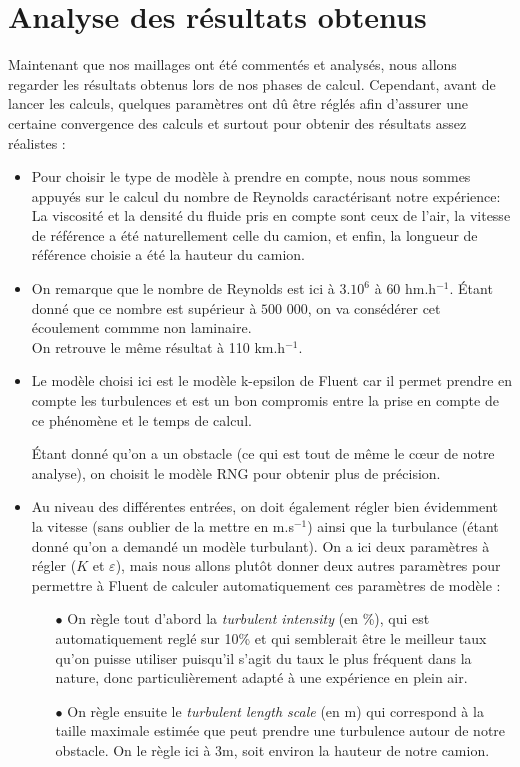 \section{Analyse des résultats obtenus}
Maintenant que nos maillages ont été commentés et analysés, nous allons regarder les résultats obtenus lors de nos phases de calcul. Cependant, avant de lancer les calculs, quelques paramètres ont dû être réglés afin d'assurer une certaine convergence des calculs et surtout pour obtenir des résultats assez réalistes :
\begin{itemize}
	\item Pour choisir le type de modèle à prendre en compte, nous nous sommes appuyés sur le calcul du nombre de Reynolds caractérisant notre expérience: La viscosité et la densité du fluide pris en compte sont ceux de l'air, la vitesse de référence a été naturellement celle du camion, et enfin, la longueur de référence choisie a été la hauteur du camion.
	\item On remarque que le nombre de Reynolds est ici à $3.10^6$ à $60$ hm.h$^{-1}$. Étant donné que ce nombre est supérieur à $500$ $000$, on va consédérer cet écoulement commme non laminaire. \\%
On retrouve le même résultat à 110 km.h$^{-1}$. 
	\item Le modèle choisi ici est le modèle k-epsilon de Fluent car il permet prendre en compte les turbulences et est un bon compromis entre la prise en compte de ce phénomène et le temps de calcul.


Étant donné qu'on a un obstacle (ce qui est tout de même le c\oe ur de notre analyse), on choisit le modèle RNG pour obtenir plus de précision.
	\item Au niveau des différentes entrées, on doit également régler bien évidemment la vitesse (sans oublier de la mettre en m.s$^{-1}$) ainsi que la turbulance (étant donné qu'on a demandé un modèle turbulant). On a ici deux paramètres à régler ($K$ et $\varepsilon$), mais nous allons plutôt donner deux autres paramètres pour permettre à Fluent de calculer automatiquement ces paramètres de modèle :
	\begin{itemize}
		\item[$\bullet$] On règle tout d'abord la \textit{turbulent intensity} (en \%), qui est automatiquement reglé sur 10\% et qui semblerait être le meilleur taux qu'on puisse utiliser puisqu'il s'agit du taux le plus fréquent dans la nature, donc particulièrement adapté à une expérience en plein air. 
		\item[$\bullet$] On règle ensuite le \textit{turbulent length scale} (en m) qui correspond à la taille maximale estimée que peut prendre une turbulence autour de notre obstacle. %
On le règle ici à 3m, soit environ la hauteur de notre camion.
	\end{itemize}
\end{itemize}

